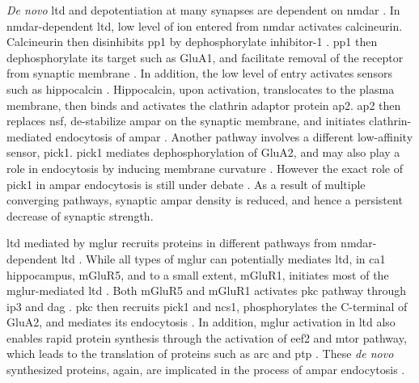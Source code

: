 \textit{De novo} \gls{ltd} and depotentiation at many synapses are dependent on \gls{nmdar} \citep{collingridge83, dudek92}. In \gls{nmdar}-dependent \gls{ltd}, low level of  ion entered from \gls{nmdar} activates calcineurin. Calcineurin then disinhibits \gls{pp1} by dephosphorylate inhibitor-1 \citep{mulkey93}. \Gls{pp1} then dephosphorylate its target such as GluA1, and facilitate removal of the receptor from synaptic membrane \citep{collingridge04}. In addition, the low level of  entry activates  sensors such as hippocalcin \citep{palmer05}. Hippocalcin, upon activation, translocates to the plasma membrane, then binds and activates the clathrin adaptor protein \gls{ap2}. \Gls{ap2} then replaces \gls{nsf}, de-stabilize \gls{ampar} on the synaptic membrane, and initiates clathrin-mediated endocytosis of \gls{ampar} \citep{collingridge04, palmer05}. Another pathway involves a different low-affinity  sensor, \gls{pick1}. \Gls{pick1} mediates dephosphorylation of GluA2, and may also play a role in endocytosis by inducing membrane curvature \citep{collingridge04, lin07}. However the exact role of \gls{pick1} in \gls{ampar} endocytosis is still under debate \citep{collingridge10}. As a result of multiple converging pathways, synaptic \gls{ampar} density is reduced, and hence a persistent decrease of synaptic strength.

\Gls{ltd} mediated by \gls{mglur} recruits proteins in different pathways from \gls{nmdar}-dependent \gls{ltd} \citep{gladding09}. While all types of \gls{mglur} can potentially mediates \gls{ltd}, in \gls{ca1} hippocampus, mGluR5, and to a small extent, mGluR1, initiates most of the \gls{mglur}-mediated \gls{ltd} \citep{luscher10}. Both mGluR5 and mGluR1 activates \gls{pkc} pathway through \gls{ip3} and \gls{dag} \citep{oliet97}. \Gls{pkc} then recruits \gls{pick1} and \gls{ncs1}, phosphorylates the C-terminal of GluA2, and mediates its endocytosis \citep{bellone06, jo08}. In addition, \gls{mglur} activation in \gls{ltd} also enables rapid protein synthesis through the activation of \gls{eef2} and \gls{mtor} pathway, which leads to the translation of proteins such as \gls{arc} and \gls{ptp} \citep{park08, zhang08}. These \textit{de novo} synthesized proteins, again, are implicated in the process of \gls{ampar} endocytosis \citep{collingridge10}.

